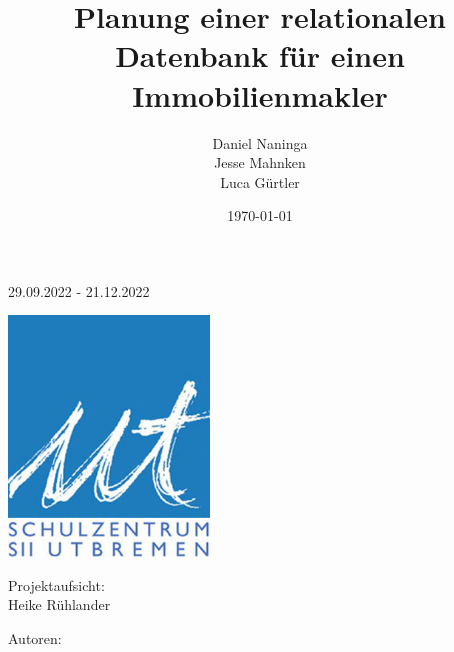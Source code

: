 \title{Planung einer relationalen Datenbank für einen Immobilienmakler}
\author{Daniel Naninga\\Jesse Mahnken\\Luca Gürtler}
\date{\today}

\makeatletter
\begin{titlepage}
\begin{center}
    \Huge
    \@title

    \Large
    29.09.2022 - 21.12.2022

    \vspace*{1cm}
    \center
    \includegraphics[width=0.4\textwidth]{images/szut_logo}
    \vspace*{1cm}

    \large
    Projektaufsicht:\\
    \Large
    Heike Rühlander

    \vspace*{1cm}

    \large
    Autoren:\\
    \Large
    \@author
\end{center}
\end{titlepage}
\makeatother
\newpage